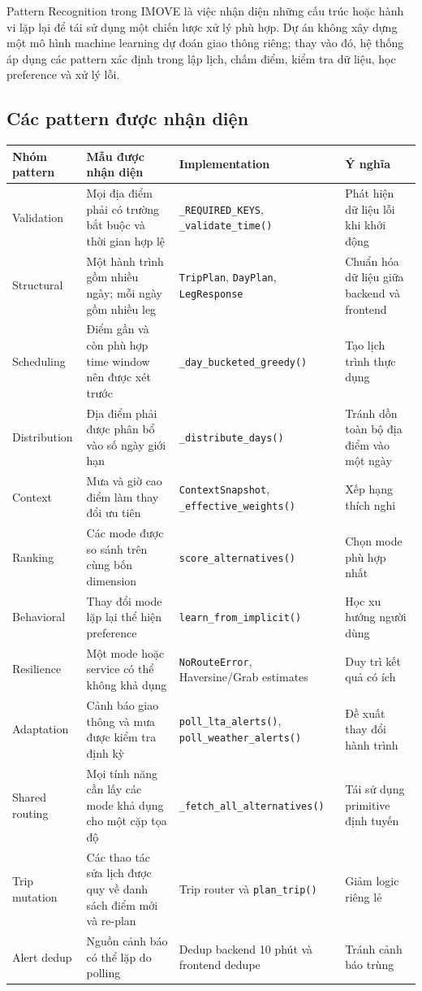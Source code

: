 \documentclass[12pt,a4paper]{article}
\begin{document}
Pattern Recognition trong IMOVE là việc nhận diện những cấu trúc hoặc hành vi lặp lại để tái sử dụng một chiến lược xử lý phù hợp. Dự án không xây dựng một mô hình machine learning dự đoán giao thông riêng; thay vào đó, hệ thống áp dụng các pattern xác định trong lập lịch, chấm điểm, kiểm tra dữ liệu, học preference và xử lý lỗi.

\subsection{Các pattern được nhận diện}


\begin{longtable}{|L{2.6cm}|L{4.0cm}|L{5cm}|L{4.2cm}|}
\hline
\textbf{Nhóm pattern} & \textbf{Mẫu được nhận diện} & \textbf{Implementation} & \textbf{Ý nghĩa} \\ \hline
\endhead
Validation & Mọi địa điểm phải có trường bắt buộc và thời gian hợp lệ & \texttt{\_REQUIRED\_KEYS}, \texttt{\_validate\_time()} & Phát hiện dữ liệu lỗi khi khởi động \\ \hline
Structural & Một hành trình gồm nhiều ngày; mỗi ngày gồm nhiều leg & \texttt{TripPlan}, \texttt{DayPlan}, \texttt{LegResponse} & Chuẩn hóa dữ liệu giữa backend và frontend \\ \hline
Scheduling & Điểm gần và còn phù hợp time window nên được xét trước & \texttt{\_day\_bucketed\_greedy()} & Tạo lịch trình thực dụng \\ \hline
Distribution & Địa điểm phải được phân bổ vào số ngày giới hạn & \texttt{\_distribute\_days()} & Tránh dồn toàn bộ địa điểm vào một ngày \\ \hline
Context & Mưa và giờ cao điểm làm thay đổi ưu tiên & \texttt{ContextSnapshot}, \texttt{\_effective\_weights()} & Xếp hạng thích nghi \\ \hline
Ranking & Các mode được so sánh trên cùng bốn dimension & \texttt{score\_alternatives()} & Chọn mode phù hợp nhất \\ \hline
Behavioral & Thay đổi mode lặp lại thể hiện preference & \texttt{learn\_from\_implicit()} & Học xu hướng người dùng \\ \hline
Resilience & Một mode hoặc service có thể không khả dụng & \texttt{NoRouteError}, Haversine/Grab estimates & Duy trì kết quả có ích \\ \hline
Adaptation & Cảnh báo giao thông và mưa được kiểm tra định kỳ & \texttt{poll\_lta\_alerts()}, \texttt{poll\_weather\_alerts()} & Đề xuất thay đổi hành trình \\ \hline
Shared routing & Mọi tính năng cần lấy các mode khả dụng cho một cặp tọa độ & \texttt{\_fetch\_all\_alternatives()} & Tái sử dụng primitive định tuyến \\ \hline
Trip mutation & Các thao tác sửa lịch được quy về danh sách điểm mới và re-plan & Trip router và \texttt{plan\_trip()} & Giảm logic riêng lẻ \\ \hline
Alert dedup & Nguồn cảnh báo có thể lặp do polling & Dedup backend 10 phút và frontend dedupe & Tránh cảnh báo trùng \\ \hline
\end{longtable}
\end{document}
